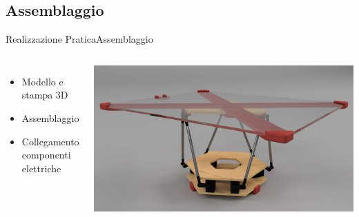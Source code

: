 \documentclass[10pt,aspectratio=169
	]{beamer}
\begin{document}
	\subsection{Assemblaggio}
	\begin{frame}{Realizzazione Pratica}{Assemblaggio}

	\begin{columns}
	
	\begin{itemize}
		
		\item Modello e stampa 3D
		\item Assemblaggio
		\item Collegamento componenti elettriche
	\end{itemize}
	\centering \includegraphics[width=\textwidth]{./images/stewart.png}
	\end{columns}
	\end{frame}
	
\end{document}
